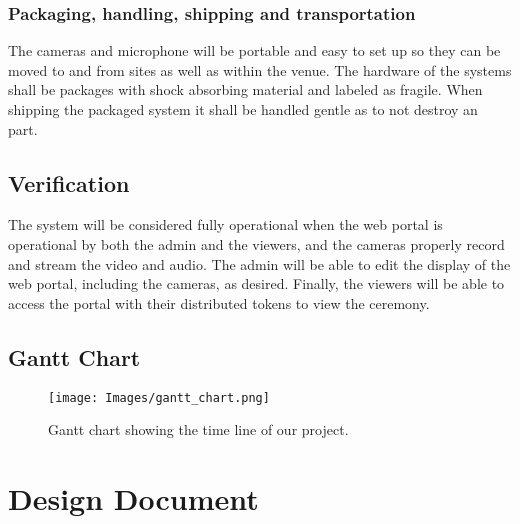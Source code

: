 \documentclass[onecolumn, draftclsnofoot,10pt, compsoc]{IEEEtran}
\begin{document}
    \subsubsection{Packaging, handling, shipping and transportation}
    The cameras and microphone will be portable and easy to set up so they can be moved to and from sites as well as within the venue. 
    The hardware of the systems shall be packages with shock absorbing material and labeled as fragile. 
    When shipping the packaged system it shall be handled gentle as to not destroy an part. 
    
\subsection{Verification}
The system will be considered fully operational when the web portal is operational by both the admin and the viewers, and the cameras properly record and stream the video and audio.
The admin will be able to edit the display of the web portal, including the cameras, as desired.
Finally, the viewers will be able to access the portal with their distributed tokens to view the ceremony.

\subsection{Gantt Chart}
\begin{figure}[h]
    \centering
    \texttt{[image: Images/gantt\_chart.png]} 
    \caption{Gantt chart showing the time line of our project.}
\label{fig1}
\end{figure}
\newpage
\section{Design Document}
\end{document}
